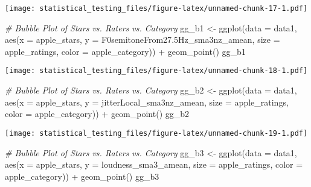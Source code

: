 \documentclass[
]{article}
\newenvironment{Shaded}{\begin{snugshade}}{\end{snugshade}}
\newcommand{\AttributeTok}[1]{\textcolor[rgb]{0.77,0.63,0.00}{#1}}
\newcommand{\CommentTok}[1]{\textcolor[rgb]{0.56,0.35,0.01}{\textit{#1}}}
\newcommand{\FloatTok}[1]{\textcolor[rgb]{0.00,0.00,0.81}{#1}}
\newcommand{\FunctionTok}[1]{\textcolor[rgb]{0.00,0.00,0.00}{#1}}
\newcommand{\NormalTok}[1]{#1}
\newcommand{\OtherTok}[1]{\textcolor[rgb]{0.56,0.35,0.01}{#1}}
\newcommand{\SpecialCharTok}[1]{\textcolor[rgb]{0.00,0.00,0.00}{#1}}
\begin{document}
\texttt{[image: statistical\_testing\_files/figure-latex/unnamed-chunk-17-1.pdf]}

\begin{Shaded}
\begin{Highlighting}[]
\CommentTok{\# Bubble Plot of Stars vs. Raters vs. Category}
\NormalTok{gg\_b1 }\OtherTok{\textless{}{-}} \FunctionTok{ggplot}\NormalTok{(}\AttributeTok{data =}\NormalTok{ data1, }\FunctionTok{aes}\NormalTok{(}\AttributeTok{x =}\NormalTok{ apple\_stars, }\AttributeTok{y =}\NormalTok{ F0semitoneFrom27}\FloatTok{.5}\NormalTok{Hz\_sma3nz\_amean, }\AttributeTok{size =}\NormalTok{ apple\_ratings, }\AttributeTok{color =}\NormalTok{ apple\_category)) }\SpecialCharTok{+}
  \FunctionTok{geom\_point}\NormalTok{()}
\NormalTok{gg\_b1}
\end{Highlighting}
\end{Shaded}

\texttt{[image: statistical\_testing\_files/figure-latex/unnamed-chunk-18-1.pdf]}

\begin{Shaded}
\begin{Highlighting}[]
\CommentTok{\# Bubble Plot of Stars vs. Raters vs. Category}
\NormalTok{gg\_b2 }\OtherTok{\textless{}{-}} \FunctionTok{ggplot}\NormalTok{(}\AttributeTok{data =}\NormalTok{ data1, }\FunctionTok{aes}\NormalTok{(}\AttributeTok{x =}\NormalTok{ apple\_stars, }\AttributeTok{y =}\NormalTok{ jitterLocal\_sma3nz\_amean, }\AttributeTok{size =}\NormalTok{ apple\_ratings, }\AttributeTok{color =}\NormalTok{ apple\_category)) }\SpecialCharTok{+}
  \FunctionTok{geom\_point}\NormalTok{()}
\NormalTok{gg\_b2}
\end{Highlighting}
\end{Shaded}

\texttt{[image: statistical\_testing\_files/figure-latex/unnamed-chunk-19-1.pdf]}

\begin{Shaded}
\begin{Highlighting}[]
\CommentTok{\# Bubble Plot of Stars vs. Raters vs. Category}
\NormalTok{gg\_b3 }\OtherTok{\textless{}{-}} \FunctionTok{ggplot}\NormalTok{(}\AttributeTok{data =}\NormalTok{ data1, }\FunctionTok{aes}\NormalTok{(}\AttributeTok{x =}\NormalTok{ apple\_stars, }\AttributeTok{y =}\NormalTok{ loudness\_sma3\_amean, }\AttributeTok{size =}\NormalTok{ apple\_ratings, }\AttributeTok{color =}\NormalTok{ apple\_category)) }\SpecialCharTok{+}
  \FunctionTok{geom\_point}\NormalTok{()}
\NormalTok{gg\_b3}
\end{Highlighting}
\end{Shaded}
\end{document}
